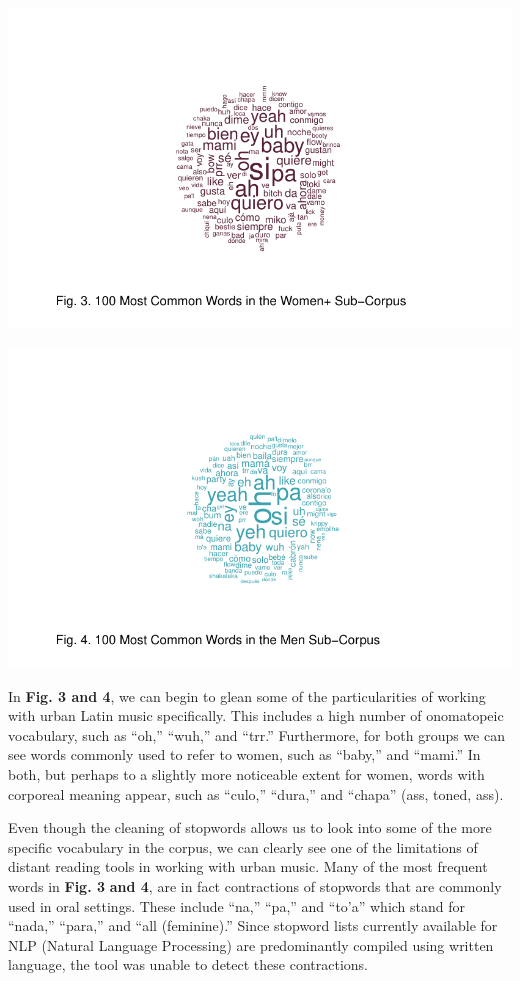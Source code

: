 \documentclass[
  letterpaper,
  DIV=11,
  numbers=noendperiod]{scrartcl}
\begin{document}
\includegraphics{Sastoque_Essay3_files/figure-pdf/word-cloud-by-gender-ns-1.pdf}

\includegraphics{Sastoque_Essay3_files/figure-pdf/word-cloud-by-gender-ns-2.pdf}

In \textbf{Fig. 3 and 4}, we can begin to glean some of the
particularities of working with urban Latin music specifically. This
includes a high number of onomatopeic vocabulary, such as ``oh,''
``wuh,'' and ``trr.'' Furthermore, for both groups we can see words
commonly used to refer to women, such as ``baby,'' and ``mami.'' In
both, but perhaps to a slightly more noticeable extent for women, words
with corporeal meaning appear, such as ``culo,'' ``dura,'' and ``chapa''
(ass, toned, ass).

Even though the cleaning of stopwords allows us to look into some of the
more specific vocabulary in the corpus, we can clearly see one of the
limitations of distant reading tools in working with urban music. Many
of the most frequent words in \textbf{Fig. 3} \textbf{and 4}, are in
fact contractions of stopwords that are commonly used in oral settings.
These include ``na,'' ``pa,'' and ``to'a'' which stand for ``nada,''
``para,'' and ``all (feminine).'' Since stopword lists currently
available for NLP (Natural Language Processing) are predominantly
compiled using written language, the tool was unable to detect these
contractions.
\end{document}
